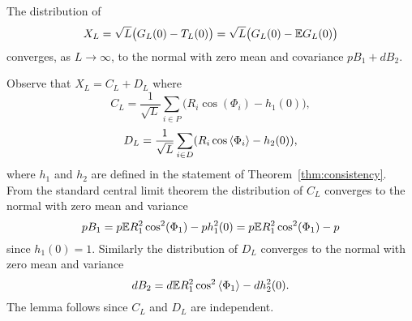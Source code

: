 \documentclass[journal]{IEEEtran}
\begin{document}



\begin{lemma}\label{lem:XL} 
The distribution of 
\[
X_L = \sqrt{L} \big( G_L(0) - T_L(0) \big) = \sqrt{L} \big( G_L(0) - {\mathbb E} G_L(0) \big)
\] 
converges, as $L \rightarrow\infty$,  to the normal with zero mean and covariance $pB_1 + d B_2.$
\end{lemma}
\begin{IEEEproof}
Observe that $X_L = C_L + D_L$ where
\[
C_L = \frac{1}{\sqrt{L}} \sum_{i \in P} \big( R_i \cos(\Phi_i) - h_1(0) \big),
\]
\[
D_L = \frac{1}{\sqrt{L}} \sum_{i \in D} (R_i \cos\left\langle \Phi_i \right\rangle - h_2(0) ),
\]
where $h_1$ and $h_2$ are defined in the statement of Theorem~\ref{thm:consistency}.  From the standard central limit theorem the distribution of $C_L$ converges to the normal with zero mean and variance
\[
p B_1 = p {\mathbb E} R_1^2 \cos^2(\Phi_1) - p h_1^2(0) =  p {\mathbb E} R_1^2 \cos^2(\Phi_1) - p 
\]
since $h_1(0) = 1$.  Similarly the distribution of $D_L$ converges to the normal with zero mean and variance
\[
d B_2 = d {\mathbb E} R_1^2 \cos^2\left\langle \Phi_1 \right\rangle - d h_2^2(0).
\]
The lemma follows since $C_L$ and $D_L$ are independent.
\end{IEEEproof}
\end{document}
